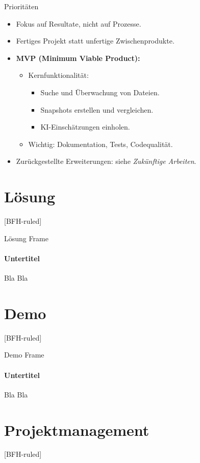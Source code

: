 \documentclass[
	ngerman,%
	authorontitle=true,
	]{bfhbeamer}
\begin{document}
\begin{frame}{Priorit\"aten}
	\begin{itemize}
		\item Fokus auf Resultate, nicht auf Prozesse.
		\item Fertiges Projekt statt unfertige Zwischenprodukte.
		\item \textbf{MVP (Minimum Viable Product):}
		\begin{itemize}
			\item Kernfunktionalit\"at:
			\begin{itemize}
				\item Suche und \"Uberwachung von Dateien.
				\item Snapshots erstellen und vergleichen.
				\item KI-Einsch\"atzungen einholen.
			\end{itemize}
			\item Wichtig: Dokumentation, Tests, Codequalit\"at.
		\end{itemize}
		\item Zur\"uckgestellte Erweiterungen: siehe \textit{Zuk\"unftige Arbeiten}.
	\end{itemize}
\end{frame}



\section{Lösung}\label{sec:loesung}
[BFH-ruled]
\frame{\sectionpage}

\begin{frame}{Lösung Frame}
	\framesubtitle{Untertitel}
	Bla Bla
\end{frame}

\section{Demo}\label{sec:demo}
[BFH-ruled]
\frame{\sectionpage}

\begin{frame}{Demo Frame}
	\framesubtitle{Untertitel}
	Bla Bla
\end{frame}

\section{Projektmanagement}\label{sec:projektmanagement}
[BFH-ruled]
\frame{\sectionpage}
\end{document}
